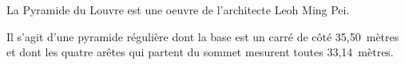 \documentclass[10pt]{article}
\begin{document}
\setlength\parindent{0mm}
\pagestyle{fancy}
\thispagestyle{empty}
    
    
    




\medskip

La Pyramide du Louvre est une oeuvre de l'architecte Leoh Ming Pei.

Il s'agit d'une pyramide régulière dont la base est un carré de côté 35,50~mètres et dont
les quatre arêtes qui partent du sommet mesurent toutes 33,14~mètres.

\medskip
\end{document}
